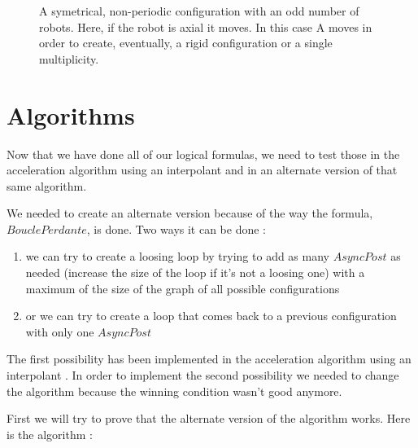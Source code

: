 \documentclass{article}
\begin{document}
\begin{figure}[!h]
    \centering
    \def\svgscale{0.3}
    
    \caption{A symetrical, non-periodic configuration with an odd number of robots. Here, if the robot is axial it moves. In this case A moves in order to create, eventually, a rigid configuration or a single multiplicity.}
    \label{dessinOdd}
\end{figure}

\section{Algorithms}

Now that we have done all of our logical formulas, we need to test those in the acceleration algorithm using an interpolant \cite{algo} and in an alternate version of that same algorithm.

We needed to create an alternate version because of the way the formula, $BouclePerdante$, is done. Two ways it can be done :
\begin{enumerate}
    \item we can try to create a loosing loop by trying to add as many $AsyncPost$ as needed (increase the size of the loop if it's not a loosing one) with a maximum of the size of the graph of all possible configurations
    \item or we can try to create a loop that comes back to a previous configuration with only one $AsyncPost$
\end{enumerate}

The first possibility has been implemented in the acceleration algorithm using an interpolant \cite{algo}. In order to implement the second possibility we needed to change the algorithm because the winning condition wasn't good anymore.

First we will try to prove that the alternate version of the algorithm works.
Here is the algorithm :
\end{document}
